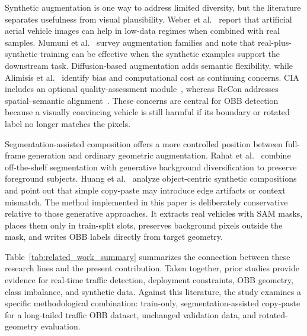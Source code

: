 Synthetic augmentation is one way to address limited diversity, but the literature separates usefulness from visual plausibility. Weber et al.~\cite{Weber2021ArtificialImagesVehicleDetection} report that artificial aerial vehicle images can help in low-data regimes when combined with real samples. Mumuni et al.~\cite{Mumuni2024} survey augmentation families and note that real-plus-synthetic training can be effective when the synthetic examples support the downstream task. Diffusion-based augmentation adds semantic flexibility, while Alimisis et al.~\cite{Alimisis2025Advances} identify bias and computational cost as continuing concerns. CIA includes an optional quality-assessment module~\cite{Benkedadra2024}, whereas ReCon addresses spatial--semantic alignment~\cite{ZhuH2025}. These concerns are central for OBB detection because a visually convincing vehicle is still harmful if its boundary or rotated label no longer matches the pixels.

Segmentation-assisted composition offers a more controlled position between full-frame generation and ordinary geometric augmentation. Rahat et al.~\cite{Rahat2024} combine off-the-shelf segmentation with generative background diversification to preserve foreground subjects. Huang et al.~\cite{HuangW2025} analyze object-centric synthetic compositions and point out that simple copy-paste may introduce edge artifacts or context mismatch. The method implemented in this paper is deliberately conservative relative to those generative approaches. It extracts real vehicles with SAM masks, places them only in train-split slots, preserves background pixels outside the mask, and writes OBB labels directly from target geometry.

Table~\ref{tab:related_work_summary} summarizes the connection between these research lines and the present contribution. Taken together, prior studies provide evidence for real-time traffic detection, deployment constraints, OBB geometry, class imbalance, and synthetic data. Against this literature, the study examines a specific methodological combination: train-only, segmentation-assisted copy-paste for a long-tailed traffic OBB dataset, unchanged validation data, and rotated-geometry evaluation.

